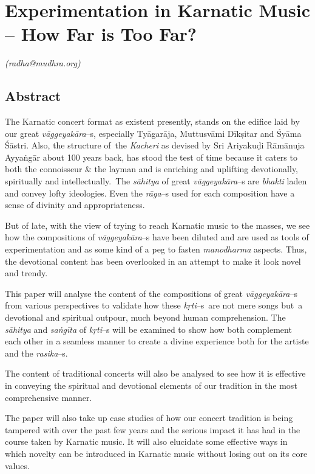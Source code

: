 
\chapter{Experimentation in Karnatic Music – How Far is Too Far?}\label{chapter4}


\begin{flushright}
\textit{(radha@mudhra.org)}
\end{flushright}


\section*{Abstract}

The Karnatic concert format as existent presently, stands on the edifice laid by our great \textit{vāggeyakāra}–s, especially Tyāgarāja, Muttusvāmi Dīkṣitar and Śyāma Śāstri. Also, the structure of the \textit{Kacheri} as devised by Sri Ariyakuḍi Rāmānuja Ayyaṅgār about 100 years back, has stood the test of time because it caters to both the connoisseur \& the layman and is enriching and uplifting devotionally, spiritually and intellectually. The \textit{sāhitya} of great \textit{vāggeyakāra}–s are \textit{bhakti} laden and convey lofty ideologies. Even the \textit{rāga}–s used for each composition have a sense of divinity and appropriateness.

But of late, with the view of trying to reach Karnatic music to the masses, we see how the compositions of \textit{vāggeyakāra}–s have been diluted and are used as tools of experimentation and as some kind of a peg to fasten \textit{manodharma} aspects. Thus, the devotional content has been overlooked in an attempt to make it look novel and trendy.

This paper will analyse the content of the compositions of great \textit{vāggeyakāra}–s from various perspectives to validate how these \textit{kṛti}–s\break  are not mere songs but a devotional and spiritual outpour, much beyond human comprehension. The \textit{sāhitya} and \textit{saṅgīta} of \textit{kṛti}–s will be examined to show how both complement each other in a seamless manner to create a divine experience both for the artiste and the \textit{rasika}–s.

The content of traditional concerts will also be analysed to see how it is effective in conveying the spiritual and devotional elements of our tradition in the most comprehensive manner.

The paper will also take up case studies of how our concert tradition is being tampered with over the past few years and the serious impact it has had in the course taken by Karnatic music. It will also elucidate some effective ways in which novelty can be introduced in Karnatic music without losing out on its core values.


